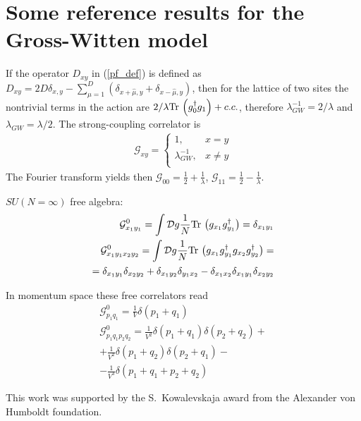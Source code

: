 \documentclass[twocolumn,showpacs,preprintnumbers,superscriptaddress,amsmath,floatfix,amssymb,secnumarabic]{revtex4}
\newcommand{\lr}[1]{ \left( #1 \right) }
\newcommand{\tr}{ {\rm Tr} \, }
\begin{document}
\section{Some reference results for the Gross-Witten model}

 If the operator $D_{x y}$ in (\ref{pf_def}) is defined as $D_{x y} = 2 D \delta_{x,y} - \sum\limits_{\mu=1}^{D} \lr{\delta_{x+\hat{\mu},y} + \delta_{x-\hat{\mu},y}}$, then for the lattice of two sites the nontrivial terms in the action are $2/\lambda \tr\lr{g^{\dag}_0 g_1} + c.c.$, therefore $\lambda_{GW}^{-1} = 2/\lambda$ and $\lambda_{GW} = \lambda/2$. The strong-coupling correlator is
\begin{eqnarray}
\label{gw_sc_correlator}
 \mathcal{G}_{xy} =
 \begin{cases}
                  1, & x = y \\
  \lambda_{GW}^{-1}, & x \neq y \\
 \end{cases}
\end{eqnarray}
The Fourier transform yields then $\mathcal{G}_{00} = \frac{1}{2} + \frac{1}{\lambda}$, $\mathcal{G}_{11} = \frac{1}{2} - \frac{1}{\lambda}$.

$SU\lr{N=\infty}$ free algebra:
\begin{eqnarray}
\label{sun_free_algebra}
 \mathcal{G}^{0}_{x_1 y_1} = \int\mathcal{D}g \frac{1}{N} \tr\lr{g_{x_1} g^{\dag}_{y_1}}
 = \delta_{x_1 y_1}
\nonumber \\
 \mathcal{G}^{0}_{x_1 y_1 x_2 y_2} = \int\mathcal{D}g \frac{1}{N} \tr\lr{g_{x_1} g^{\dag}_{y_1} g_{x_2} g^{\dag}_{y_2}}
 = \nonumber \\ =
 \delta_{x_1 y_1} \delta_{x_2 y_2} + \delta_{x_1 y_2} \delta_{y_1 x_2} - \delta_{x_1 x_2} \delta_{x_1 y_1} \delta_{x_2 y_2}
\end{eqnarray}

In momentum space these free correlators read
\begin{eqnarray}
\label{sun_free_algebra_mspace}
 \mathcal{G}^{0}_{p_1 q_1} = \frac{1}{V} \delta\lr{p_1 + q_1}
\nonumber \\
 \mathcal{G}^{0}_{p_1 q_1 p_2 q_2} =
 \frac{1}{V^2} \delta\lr{p_1 + q_1} \delta\lr{p_2 + q_2}
 + \nonumber \\ +
 \frac{1}{V^2} \delta\lr{p_1 + q_2} \delta\lr{p_2 + q_1}
 - \nonumber \\ -
 \frac{1}{V^3} \delta\lr{p_1 + q_1 + p_2 + q_2}
\end{eqnarray}

\begin{acknowledgments}
 This work was supported by the S.~Kowalevskaja award from the Alexander von Humboldt foundation.
\end{acknowledgments}



\end{document}
